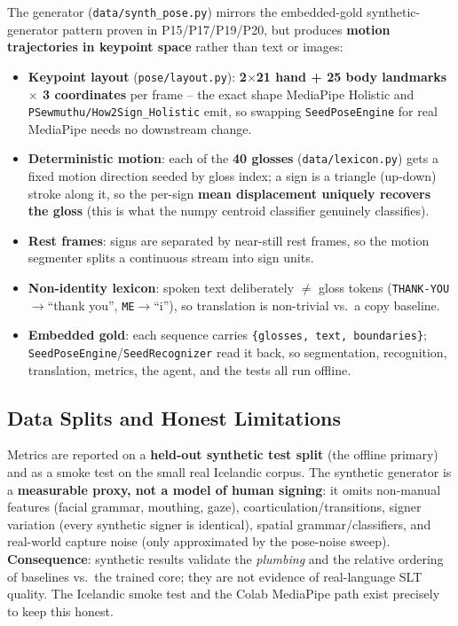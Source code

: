 \documentclass[12pt,a4paper]{article}
\begin{document}
The generator (\texttt{data/synth\_pose.py}) mirrors the embedded-gold synthetic-generator pattern proven in P15/P17/P19/P20, but produces \textbf{motion trajectories in keypoint space} rather than text or images:
\begin{itemize}\setlength\itemsep{0.15em}
  \item \textbf{Keypoint layout} (\texttt{pose/layout.py}): \textbf{2$\times$21 hand + 25 body landmarks $\times$ 3 coordinates} per frame -- the exact shape MediaPipe Holistic and \texttt{PSewmuthu/How2Sign\_Holistic} emit, so swapping \texttt{SeedPoseEngine} for real MediaPipe needs no downstream change.
  \item \textbf{Deterministic motion}: each of the \textbf{40 glosses} (\texttt{data/lexicon.py}) gets a fixed motion direction seeded by gloss index; a sign is a triangle (up-down) stroke along it, so the per-sign \textbf{mean displacement uniquely recovers the gloss} (this is what the numpy centroid classifier genuinely classifies).
  \item \textbf{Rest frames}: signs are separated by near-still rest frames, so the motion segmenter splits a continuous stream into sign units.
  \item \textbf{Non-identity lexicon}: spoken text deliberately $\neq$ gloss tokens (\texttt{THANK-YOU}$\rightarrow$``thank you'', \texttt{ME}$\rightarrow$``i''), so translation is non-trivial vs.\ a copy baseline.
  \item \textbf{Embedded gold}: each sequence carries \texttt{\{glosses, text, boundaries\}}; \texttt{SeedPoseEngine}/\texttt{SeedRecognizer} read it back, so segmentation, recognition, translation, metrics, the agent, and the tests all run offline.
\end{itemize}

\subsection{Data Splits and Honest Limitations}

Metrics are reported on a \textbf{held-out synthetic test split} (the offline primary) and as a smoke test on the small real Icelandic corpus. The synthetic generator is a \textbf{measurable proxy, not a model of human signing}: it omits non-manual features (facial grammar, mouthing, gaze), coarticulation/transitions, signer variation (every synthetic signer is identical), spatial grammar/classifiers, and real-world capture noise (only approximated by the pose-noise sweep). \textbf{Consequence}: synthetic results validate the \emph{plumbing} and the relative ordering of baselines vs.\ the trained core; they are not evidence of real-language SLT quality. The Icelandic smoke test and the Colab MediaPipe path exist precisely to keep this honest.
\end{document}
